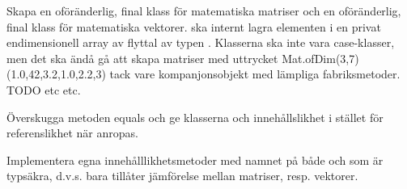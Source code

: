\Subtask 

\ExtraTasks %

\Task Skapa en oföränderlig, final klass  för matematiska matriser och en oföränderlig, final klass  för matematiska vektorer.  ska internt lagra elementen i en privat endimensionell array av flyttal av typen . Klasserna ska inte vara case-klasser, men det ska ändå gå att skapa matriser med uttrycket Mat.ofDim(3,7)(1.0,42,3.2,1.0,2.2,3) tack vare  kompanjonsobjekt med lämpliga fabriksmetoder. TODO etc etc.

\Subtask Överskugga metoden equals och ge klasserna  och  innehållslikhet i stället för referenslikhet när \code{==} anropas.

\Subtask Implementera egna innehålllikhetsmetoder med namnet \code{===} på både  och  som är typsäkra, d.v.s. bara tillåter jämförelse mellan matriser, resp. vektorer.

\AdvancedTasks %

\Task     
    